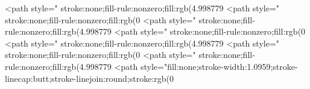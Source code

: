 <path style=" stroke:none;fill-rule:nonzero;fill:rgb(4.998779%
<path style=" stroke:none;fill-rule:nonzero;fill:rgb(0%
<path style=" stroke:none;fill-rule:nonzero;fill:rgb(4.998779%
<path style=" stroke:none;fill-rule:nonzero;fill:rgb(0%
<path style=" stroke:none;fill-rule:nonzero;fill:rgb(4.998779%
<path style=" stroke:none;fill-rule:nonzero;fill:rgb(0%
<path style=" stroke:none;fill-rule:nonzero;fill:rgb(4.998779%
<path style="fill:none;stroke-width:1.0959;stroke-linecap:butt;stroke-linejoin:round;stroke:rgb(0%

